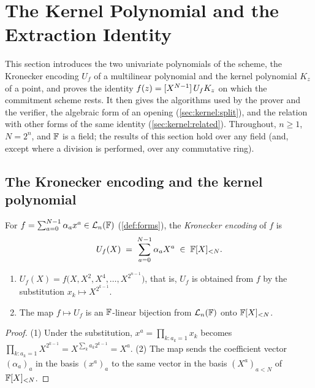 \section{The Kernel Polynomial and the Extraction Identity}\label{sec:kernel}

This section introduces the two univariate polynomials of the scheme, the Kronecker encoding $U_f$ of a multilinear polynomial and the kernel polynomial $K_z$ of a point, and proves the identity $f(z) = [X^{N-1}]\,U_f K_z$ on which the commitment scheme rests.
It then gives the algorithms used by the prover and the verifier, the algebraic form of an opening (\cref{sec:kernel:split}), and the relation with other forms of the same identity (\cref{sec:kernel:related}).
Throughout, $n \ge 1$, $N = 2^n$, and $\mathbb{F}$ is a field; the results of this section hold over any field (and, except where a division is performed, over any commutative ring).

\subsection{The Kronecker encoding and the kernel polynomial}\label{sec:kernel:def}

\begin{definition}\label{def:kron-enc}
For $f = \sum_{a=0}^{N-1} \alpha_a x^a \in \mathcal{L}_n(\mathbb{F})$ (\cref{def:forms}), the \emph{Kronecker encoding} of $f$ is
\[
  U_f(X) \;=\; \sum_{a=0}^{N-1} \alpha_a X^a \;\in\; \mathbb{F}[X]_{<N}.
\]
\end{definition}

\begin{lemma}\label{lem:kron-sub}
\begin{enumerate}
  \item $U_f(X) = f\bigl(X, X^2, X^4, \dots, X^{2^{n-1}}\bigr)$, that is, $U_f$ is obtained from $f$ by the substitution $x_k \mapsto X^{2^{k-1}}$.
  \item The map $f \mapsto U_f$ is an $\mathbb{F}$-linear bijection from $\mathcal{L}_n(\mathbb{F})$ onto $\mathbb{F}[X]_{<N}$.
\end{enumerate}
\end{lemma}

\begin{proof}
(1) Under the substitution, $x^a = \prod_{k : a_k = 1} x_k$ becomes $\prod_{k : a_k = 1} X^{2^{k-1}} = X^{\sum_k a_k 2^{k-1}} = X^a$.
(2) The map sends the coefficient vector $(\alpha_a)_a$ in the basis $(x^a)_a$ to the same vector in the basis $(X^a)_{a < N}$ of $\mathbb{F}[X]_{<N}$.
\end{proof}

